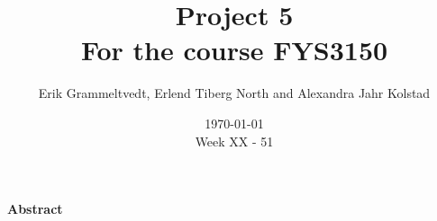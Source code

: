 \documentclass{article}
\begin{document}
\addtocounter{page}{0}

\title{Project 5 \\
      \large For the course FYS3150}
\date{\today \\
    \vspace{1mm}
    \large Week XX - 51}

\author{Erik Grammeltvedt, Erlend Tiberg North and Alexandra Jahr Kolstad}

\maketitle






\vspace{1cm}


\begin{center}

{\Large\textbf{Abstract}} \label{sec:Abstract}

\end{center}

\iffalse
In this numerical project we have simulated some solid-state properties using the two-dimensional Ising model. The system was comprised of flippings spins, and they simulated energies, heat capacity, magnetization and susceptibility. The project culminated in running a large simulation for calculating the critical temperature, $T_c$, of the system. Using \cite{task}'s set of equations a rather good approximation to Lars Onsager's \cite{onsager} results were found. The project's results were quite interesting. For a 100x100-lattice simulated with the Ising Model, a critical temperature of $2.277$ was found. Only $0.008$ of from Onsager's $\approx 2.269$!
\fi

\newpage


\vspace{1cm}

\tableofcontents

\vspace{1cm}

\vspace{1cm}
\end{document}
